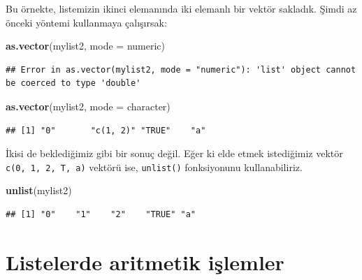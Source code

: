\documentclass[
]{book}
\newenvironment{Shaded}{\begin{snugshade}}{\end{snugshade}}
\newcommand{\DataTypeTok}[1]{\textcolor[rgb]{0.13,0.29,0.53}{#1}}
\newcommand{\KeywordTok}[1]{\textcolor[rgb]{0.13,0.29,0.53}{\textbf{#1}}}
\newcommand{\NormalTok}[1]{#1}
\newcommand{\StringTok}[1]{\textcolor[rgb]{0.31,0.60,0.02}{#1}}
\begin{document}
Bu örnekte, listemizin ikinci elemanında iki elemanlı bir vektör sakladık. Şimdi az önceki yöntemi kullanmaya çalışırsak:

\begin{Shaded}
\begin{Highlighting}[]
\KeywordTok{as.vector}\NormalTok{(mylist2, }\DataTypeTok{mode =} \StringTok{\textquotesingle{}numeric\textquotesingle{}}\NormalTok{)}
\end{Highlighting}
\end{Shaded}

\begin{verbatim}
## Error in as.vector(mylist2, mode = "numeric"): 'list' object cannot be coerced to type 'double'
\end{verbatim}

\begin{Shaded}
\begin{Highlighting}[]
\KeywordTok{as.vector}\NormalTok{(mylist2, }\DataTypeTok{mode =} \StringTok{\textquotesingle{}character\textquotesingle{}}\NormalTok{)}
\end{Highlighting}
\end{Shaded}

\begin{verbatim}
## [1] "0"       "c(1, 2)" "TRUE"    "a"
\end{verbatim}

İkisi de beklediğimiz gibi bir sonuç değil. Eğer ki elde etmek istediğimiz vektör \texttt{c(\textquotesingle{}0\textquotesingle{},\ \textquotesingle{}1\textquotesingle{},\ \textquotesingle{}2\textquotesingle{},\ \textquotesingle{}T\textquotesingle{},\ \textquotesingle{}a\textquotesingle{})} vektörü ise, \texttt{unlist()} fonksiyonunu kullanabiliriz.

\begin{Shaded}
\begin{Highlighting}[]
\KeywordTok{unlist}\NormalTok{(mylist2)}
\end{Highlighting}
\end{Shaded}

\begin{verbatim}
## [1] "0"    "1"    "2"    "TRUE" "a"
\end{verbatim}

\hypertarget{listelerde-aritmetik-iux15flemler}{%
\section{Listelerde aritmetik işlemler}\label{listelerde-aritmetik-iux15flemler}}
\end{document}
